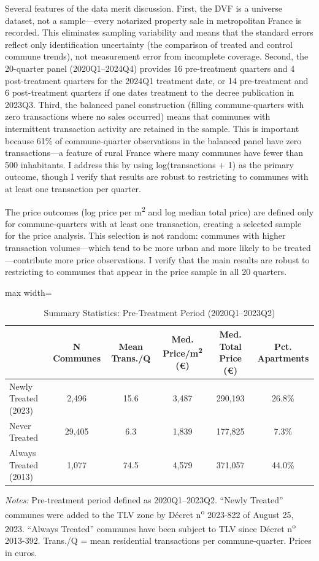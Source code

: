 \documentclass[12pt]{article}
\begin{document}
Several features of the data merit discussion. First, the DVF is a universe dataset, not a sample---every notarized property sale in metropolitan France is recorded. This eliminates sampling variability and means that the standard errors reflect only identification uncertainty (the comparison of treated and control commune trends), not measurement error from incomplete coverage. Second, the 20-quarter panel (2020Q1--2024Q4) provides 16 pre-treatment quarters and 4 post-treatment quarters for the 2024Q1 treatment date, or 14 pre-treatment and 6 post-treatment quarters if one dates treatment to the decree publication in 2023Q3. Third, the balanced panel construction (filling commune-quarters with zero transactions where no sales occurred) means that communes with intermittent transaction activity are retained in the sample. This is important because 61\% of commune-quarter observations in the balanced panel have zero transactions---a feature of rural France where many communes have fewer than 500 inhabitants. I address this by using log(transactions + 1) as the primary outcome, though I verify that results are robust to restricting to communes with at least one transaction per quarter.

The price outcomes (log price per m\textsuperscript{2} and log median total price) are defined only for commune-quarters with at least one transaction, creating a selected sample for the price analysis. This selection is not random: communes with higher transaction volumes---which tend to be more urban and more likely to be treated---contribute more price observations. I verify that the main results are robust to restricting to communes that appear in the price sample in all 20 quarters.

\begin{table}[H]
\centering
\caption{Summary Statistics: Pre-Treatment Period (2020Q1--2023Q2)}
\label{tab:summary}
\begin{adjustbox}{max width=\textwidth}
\begin{tabular}{lccccc}
\toprule
 & N Communes & Mean Trans./Q & Med. Price/m\textsuperscript{2} (\euro{}) & Med. Total Price (\euro{}) & Pct. Apartments \\
\midrule
Newly Treated (2023) & 2,496 & 15.6 & 3,487 & 290,193 & 26.8\% \\
Never Treated & 29,405 & 6.3 & 1,839 & 177,825 & 7.3\% \\
Always Treated (2013) & 1,077 & 74.5 & 4,579 & 371,057 & 44.0\% \\
\bottomrule
\end{tabular}
\end{adjustbox}
\begin{minipage}{0.95\textwidth}
\vspace{0.3em}
\footnotesize
\textit{Notes:} Pre-treatment period defined as 2020Q1--2023Q2. ``Newly Treated'' communes were added to the TLV zone by D\'ecret n\textsuperscript{o} 2023-822 of August 25, 2023. ``Always Treated'' communes have been subject to TLV since D\'ecret n\textsuperscript{o} 2013-392. Trans./Q = mean residential transactions per commune-quarter. Prices in euros.
\end{minipage}
\end{table}
\end{document}
